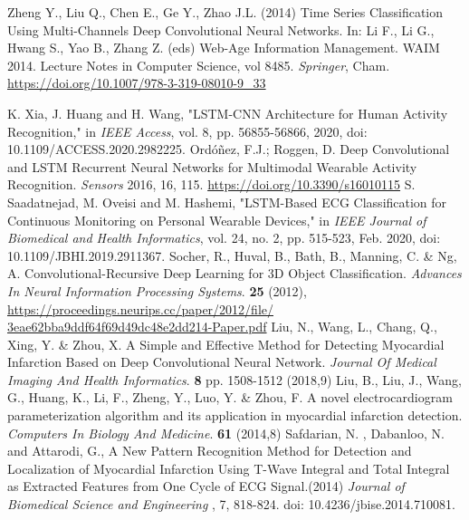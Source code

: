 \documentclass{ieeeaccess}
\begin{document}
\begin{thebibliography}{1}
Zheng Y., Liu Q., Chen E., Ge Y., Zhao J.L. (2014) Time Series Classification Using Multi-Channels Deep Convolutional Neural Networks. In: Li F., Li G., Hwang S., Yao B., Zhang Z. (eds) Web-Age Information Management. WAIM 2014. Lecture Notes in Computer Science, vol 8485. {\em Springer}, Cham. \url{https://doi.org/10.1007/978-3-319-08010-9_33}

 K. Xia, J. Huang and H. Wang, "LSTM-CNN Architecture for Human Activity Recognition," in {\em IEEE Access}, vol. 8, pp. 56855-56866, 2020, doi: 10.1109/ACCESS.2020.2982225.
 Ordóñez, F.J.; Roggen, D. Deep Convolutional and LSTM Recurrent Neural Networks for Multimodal Wearable Activity Recognition. {\em Sensors} 2016, 16, 115. \url{https://doi.org/10.3390/s16010115}
S. Saadatnejad, M. Oveisi and M. Hashemi, "LSTM-Based ECG Classification for Continuous Monitoring on Personal Wearable Devices," in {\em IEEE Journal of Biomedical and Health Informatics}, vol. 24, no. 2, pp. 515-523, Feb. 2020, doi: 10.1109/JBHI.2019.2911367.
Socher, R., Huval, B., Bath, B., Manning, C. \& Ng, A. Convolutional-Recursive Deep Learning for 3D Object Classification. {\em Advances In Neural Information Processing Systems}. \textbf{25} (2012), \url{https://proceedings.neurips.cc/paper/2012/file/ 3eae62bba9ddf64f69d49dc48e2dd214-Paper.pdf}
Liu, N., Wang, L., Chang, Q., Xing, Y. \& Zhou, X. A Simple and Effective Method for Detecting Myocardial Infarction Based on Deep Convolutional Neural Network. {\em Journal Of Medical Imaging And Health Informatics}. \textbf{8} pp. 1508-1512 (2018,9)
Liu, B., Liu, J., Wang, G., Huang, K., Li, F., Zheng, Y., Luo, Y. \& Zhou, F. A novel electrocardiogram parameterization algorithm and its application in myocardial infarction detection. {\em Computers In Biology And Medicine}. \textbf{61} (2014,8)
 Safdarian, N. , Dabanloo, N. and Attarodi, G., A New Pattern Recognition Method for Detection and Localization of Myocardial Infarction Using T-Wave Integral and Total Integral as Extracted Features from One Cycle of ECG Signal.(2014) {\em Journal of Biomedical Science and Engineering} , 7, 818-824. doi: 10.4236/jbise.2014.710081.


\end{thebibliography}
\end{document}
